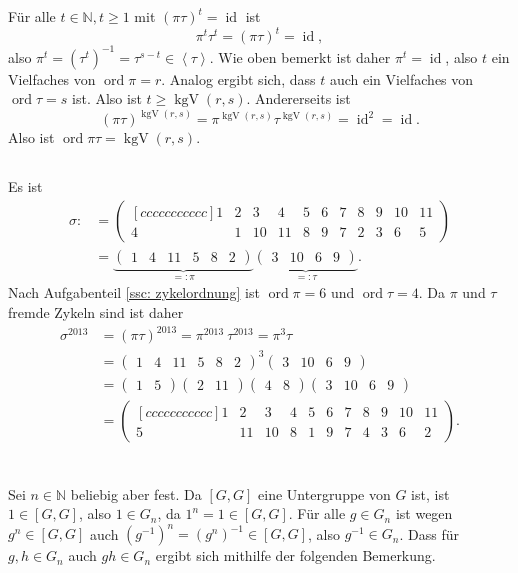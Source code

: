 \documentclass[a4paper,10pt]{article}
\theoremstyle{definition}
\newcommand{\N}{\mathbb{N}}
\newcommand{\id}{\operatorname{id}}
\newcommand{\ord}{\operatorname{ord}}
\newcommand{\kgV}{\operatorname{kgV}}
\newcommand{\vect}[1]{\begin{pmatrix}#1\end{pmatrix}}
\newcommand{\gen}[1]{\left\langle#1\right\rangle}
\begin{document}
Für alle $t \in \N, t \geq 1$ mit $(\pi \tau)^t = \id$ ist
\[
 \pi^t \tau^t = (\pi \tau)^t = \id,
\]
also $\pi^t = (\tau^t)^{-1} = \tau^{s-t} \in \gen{\tau}$. Wie oben bemerkt ist daher $\pi^t = \id$, also $t$ ein Vielfaches von $\ord \pi = r$. Analog ergibt sich, dass $t$ auch ein Vielfaches von $\ord \tau = s$ ist. Also ist $t \geq \kgV(r,s)$. Andererseits ist
\[
 (\pi \tau)^{\kgV(r,s)} = \pi^{\kgV(r,s)} \tau^{\kgV(r,s)} = \id^2 = \id.
\]
Also ist $\ord \pi\tau = \kgV(r,s)$.






\subsection{}
Es ist
\begin{align*}
 \sigma :&=
 \begin{pmatrix}[ccccccccccc]
  1 & 2 &  3 &  4 & 5 & 6 & 7 & 8 & 9 & 10 & 11\\
  4 & 1 & 10 & 11 & 8 & 9 & 7 & 2 & 3 &  6 & 5
 \end{pmatrix} \\
 &= \underbrace{\vect{1 & 4 & 11 & 5 & 8 & 2}}_{=: \pi} \underbrace{\vect{3 & 10 & 6 & 9}}_{=: \tau}.
\end{align*}
Nach Aufgabenteil \ref{ssc: zykelordnung} ist $\ord \pi = 6$ und $\ord \tau = 4$.
Da $\pi$ und $\tau$ fremde Zykeln sind ist daher
\begin{align*}
 \sigma^{2013}
 &= (\pi \tau)^{2013}
 = \pi^{2013}\ \tau^{2013}
 = \pi^3 \tau \\
 &= \vect{1 & 4 & 11 & 5 & 8 & 2}^3 \vect{3 & 10 & 6 & 9} \\
 &= \vect{1 & 5} \vect{2 & 11} \vect{4 & 8} \vect{3 & 10 & 6 & 9} \\
 &=
 \begin{pmatrix}[ccccccccccc]
  1 &  2 &  3 & 4 & 5 & 6 & 7 & 8 & 9 & 10 & 11\\
  5 & 11 & 10 & 8 & 1 & 9 & 7 & 4 & 3 &  6 &  2
 \end{pmatrix}.
\end{align*}





\section{}





\section{}
Sei $n \in \N$ beliebig aber fest. Da $[G,G]$ eine Untergruppe von $G$ ist, ist $1 \in [G,G]$, also $1 \in G_n$, da $1^n = 1 \in [G,G]$. Für alle $g \in G_n$ ist wegen $g^n \in [G,G]$ auch $(g^{-1})^n = (g^n)^{-1} \in [G,G]$, also $g^{-1} \in G_n$. Dass für $g,h \in G_n$ auch $gh \in G_n$ ergibt sich mithilfe der folgenden Bemerkung.
\end{document}
